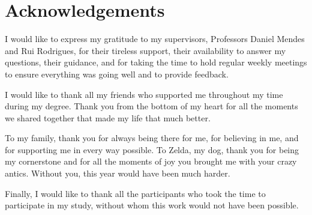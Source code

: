 \chapter*{Acknowledgements}

I would like to express my gratitude to my supervisors, Professors Daniel Mendes and Rui Rodrigues, for their tireless support, their availability to answer my questions, their guidance, and for taking the time to hold regular weekly meetings to ensure everything was going well and to provide feedback.

I would like to thank all my friends who supported me throughout my time during my degree. Thank you from the bottom of my heart for all the moments we shared together that made my life that much better.

To my family, thank you for always being there for me, for believing in me, and for supporting me in every way possible. To Zelda, my dog, thank you for being my cornerstone and for all the moments of joy you brought me with your crazy antics. Without you, this year would have been much harder.

Finally, I would like to thank all the participants who took the time to participate in my study, without whom this work would not have been possible.

\vspace{10mm}
